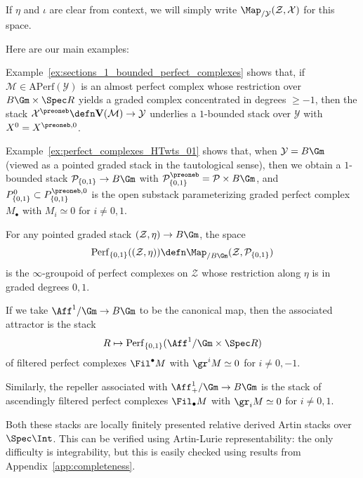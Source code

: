 \documentclass[10pt]{amsart}
\begin{document}
If $\eta$ and $\iota$ are clear from context, we will simply write $\Map_{/\mathcal{Y}}(\mathcal{Z},\mathcal{X})$ for this space.

Here are our main examples:

\begin{example}
\label{ex:1_bounded_perfect_complexes_stack}
Example~\ref{ex:sections_1_bounded_perfect_complexes} shows that, if $\mathcal{M}\in \mathrm{APerf}(\mathcal{Y})$ is an almost perfect complex whose restriction over $B\Gm\times\Spec R$ yields a graded complex concentrated in degrees $\ge -1$, then the stack $\mathcal{X}^\preoneb \defn \mathbf{V}(\mathcal{M})\to \mathcal{Y}$ underlies a $1$-bounded stack over $\mathcal{Y}$ with $X^0 = X^{\preoneb,0}$.
\end{example} 

\begin{example}
\label{ex:perfect_HT_wts_01_stack}
Example~\ref{ex:perfect_complexes_HTwts_01} shows that, when $\mathcal{Y} = B\Gm$ (viewed as a pointed graded stack in the tautological sense), then we obtain a $1$-bounded stack $\mathcal{P}_{\{0,1\}}\to B\Gm$ with $\mathcal{P}_{\{0,1\}}^\preoneb = \mathcal{P}\times B\Gm$, and $P_{\{0,1\}}^0\subset P_{\{0,1\}}^{\preoneb,0}$ is the open substack parameterizing graded perfect complex $M_\bullet$ with $M_i\simeq 0$ for $i\neq 0,1$.

For any pointed graded stack $(\mathcal{Z},\eta)\to B\Gm$, the space
\[
\mathrm{Perf}_{\{0,1\}}((\mathcal{Z},\eta))\defn \Map_{/B\Gm}(\mathcal{Z},\mathcal{P}_{\{0,1\}})
\]
is the $\infty$-groupoid of perfect complexes on $\mathcal{Z}$ whose restriction along $\eta$ is in graded degrees $0,1$. 


If we take $\Aff^1/\Gm\to B\Gm$ to be the canonical map, then the associated attractor is the stack 
\[
R\mapsto \mathrm{Perf}_{\{0,1\}}(\Aff^1/\Gm\times\Spec R) 
\]
of filtered perfect complexes $\Fil^\bullet M$ with $\gr^iM \simeq 0$ for $i\neq 0,-1$. 

Similarly, the repeller associated with $\Aff^1_+/\Gm\to B\Gm$ is the stack of ascendingly filtered perfect complexes $\Fil_\bullet M$ with $\gr_iM\simeq 0$ for $i\neq 0,1$.

Both these stacks are locally finitely presented relative derived Artin stacks over $\Spec \Int$.  This can be verified using Artin-Lurie representability: the only difficulty is integrability, but this is easily checked using results from Appendix~\ref{app:completeness}.
\end{example}    
\end{document}

